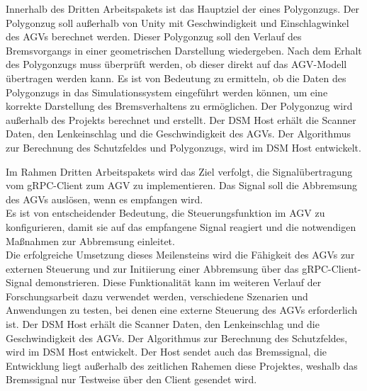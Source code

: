 Innerhalb des Dritten Arbeitspakets ist das Hauptziel der eines Polygonzugs. Der Polygonzug soll außerhalb von Unity mit Geschwindigkeit und Einschlagwinkel des AGVs berechnet werden. Dieser Polygonzug soll den Verlauf des Bremsvorgangs in einer geometrischen Darstellung wiedergeben.\newline
Nach dem Erhalt des Polygonzugs muss überprüft werden, ob dieser direkt auf das AGV-Modell übertragen werden kann. Es ist von Bedeutung zu ermitteln, ob die Daten des Polygonzugs in das Simulationssystem eingeführt werden können, um eine korrekte Darstellung des Bremsverhaltens zu ermöglichen.\newline
Der Polygonzug wird außerhalb des Projekts berechnet und erstellt. Der DSM Host erhält die Scanner Daten, den Lenkeinschlag und die Geschwindigkeit des AGVs. Der Algorithmus zur Berechnung des Schutzfeldes und Polygonzugs, wird im DSM Host entwickelt.

Im Rahmen Dritten Arbeitspakets wird das Ziel verfolgt, die Signalübertragung vom gRPC-Client zum AGV zu implementieren. Das Signal soll die Abbremsung des AGVs auslösen, wenn es empfangen wird.\\
Es ist von entscheidender Bedeutung, die Steuerungsfunktion im AGV zu konfigurieren, damit sie auf das empfangene Signal reagiert und die notwendigen Maßnahmen zur Abbremsung einleitet.\\
Die erfolgreiche Umsetzung dieses Meilensteins wird die Fähigkeit des AGVs zur externen Steuerung und zur Initiierung einer Abbremsung über das gRPC-Client-Signal demonstrieren. Diese Funktionalität kann im weiteren Verlauf der Forschungsarbeit dazu verwendet werden, verschiedene Szenarien und Anwendungen zu testen, bei denen eine externe Steuerung des AGVs erforderlich ist.
Der DSM Host erhält die Scanner Daten, den Lenkeinschlag und die Geschwindigkeit des AGVs. Der Algorithmus zur Berechnung des Schutzfeldes, wird im DSM Host entwickelt. Der Host sendet auch das Bremssignal, die Entwicklung liegt außerhalb des zeitlichen Rahemen diese Projektes, weshalb das Bremssignal nur Testweise über den Client gesendet wird.\\

